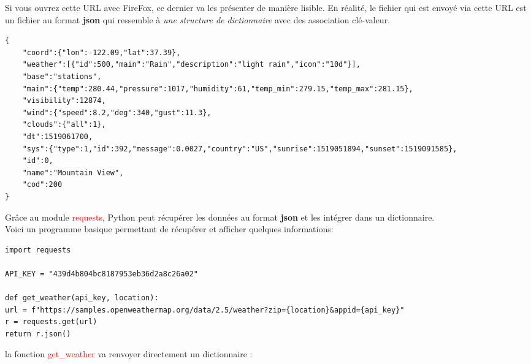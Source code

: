 \documentclass[12pt,fleqn]{book} %
\begin{document}
Si vous ouvrez cette URL avec FireFox, ce dernier va les présenter de manière lisible. En réalité, le fichier qui est envoyé via cette URL est un fichier au format \textbf{json} qui ressemble à \textit{une structure de dictionnaire} avec des association clé-valeur.

\begin{center}
	\begin{varwidth}[t]{.5\textwidth}
		\begin{lstlisting}[language=iPython,linewidth = 15cm]
{
	"coord":{"lon":-122.09,"lat":37.39},
	"weather":[{"id":500,"main":"Rain","description":"light rain","icon":"10d"}],
	"base":"stations",
	"main":{"temp":280.44,"pressure":1017,"humidity":61,"temp_min":279.15,"temp_max":281.15},
	"visibility":12874,
	"wind":{"speed":8.2,"deg":340,"gust":11.3},
	"clouds":{"all":1},
	"dt":1519061700,
	"sys":{"type":1,"id":392,"message":0.0027,"country":"US","sunrise":1519051894,"sunset":1519091585},
	"id":0,
	"name":"Mountain View",
	"cod":200
}\end{lstlisting}
\end{varwidth}\end{center}

Grâce au module \textcolor{red}{requests}, Python peut récupérer les données au format \textbf{json} et les intégrer dans un dictionnaire.\\

Voici un programme basique permettant de récupérer et afficher quelques informations:

\begin{center}
	\begin{varwidth}[t]{.5\textwidth}
		\begin{lstlisting}[language=iPython,linewidth = 15cm]
import requests

API_KEY = "439d4b804bc8187953eb36d2a8c26a02"

def get_weather(api_key, location):
url = f"https://samples.openweathermap.org/data/2.5/weather?zip={location}&appid={api_key}"
r = requests.get(url)
return r.json()\end{lstlisting}
\end{varwidth}\end{center}

la fonction \textcolor{red}{get\_weather} va renvoyer directement un dictionnaire : 
\end{document}
